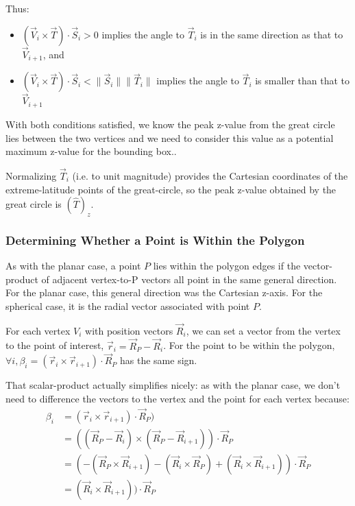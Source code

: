 \documentclass[11pt,fleqn]{report}
\begin{document}
Thus:
\begin{itemize}
  \item $\left( \vec V_i \times \vec T \right) \cdot \vec S_i > 0$ implies the
    angle to $\vec T_i$ is in the same direction as that to $\vec V_{i+1}$, and
  \item $\left( \vec V_i \times \vec T \right) \cdot \vec S_i <
    \lVert\vec S_i \rVert \lVert \vec T_i \rVert$ implies the angle to $\vec T_i$
    is smaller than that to $\vec V_{i+1}$
\end{itemize}
With both conditions satisfied, we know the peak z-value from the great circle
lies between the two vertices and we need to consider this value as a potential
maximum z-value for the bounding box..

Normalizing $\vec T_i$ (i.e. to unit magnitude) provides the Cartesian
coordinates of the extreme-latitude points of the great-circle, so the peak
z-value obtained by the great circle is $(\hat T)_z$.


\subsubsection{Determining Whether a Point is Within the Polygon}

As with the planar case, a point $P$ lies within the polygon edges if the
vector-product of adjacent vertex-to-P vectors all point in the same general
direction. For the planar case, this general direction was the Cartesian
z-axis. For the spherical case, it is the radial vector associated with
point $P$.

For each vertex $V_i$ with position vectors $\vec R_i$, we can set a vector
from the vertex to the point of interest,
$\vec r_i = \vec R_P - \vec R_i$. For the point to be within the polygon,
$\forall i, \beta_i  = (\vec r_i \times \vec r_{i+1}) \cdot \vec R_P$
has the same sign.

That scalar-product actually simplifies nicely: as with the planar case,
we don't need to difference the vectors to the vertex and the point
for each vertex because:
\begin{align*}
\beta_i &=
     (\vec r_i \times \vec r_{i+1} ) \cdot \vec R_P) \\
{}&= ((\vec R_P - \vec R_i) \times (\vec R_P - \vec R_{i+1})) \cdot \vec R_P \\
{}&= (-(\vec R_P \times \vec R_{i+1}) - (\vec R_i \times \vec R_P ) +
        (\vec R_i \times \vec R_{i+1} )) \cdot \vec R_P \\
{}&= (\vec R_i \times \vec R_{i+1} )) \cdot \vec R_P
\end{align*}
\end{document}
